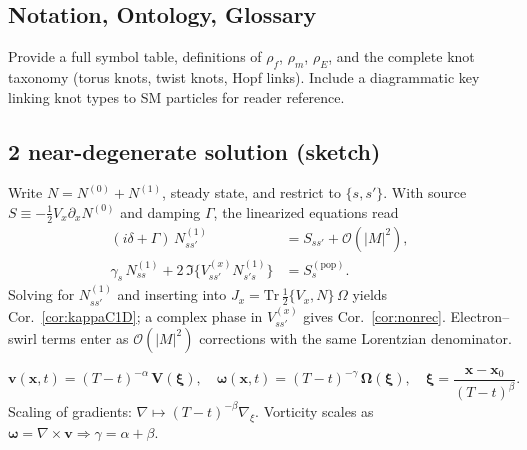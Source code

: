 \documentclass[10pt,reprint,aps,onecolumn,nofootinbib]{revtex4-2}
\begin{document}
\subsection{Notation, Ontology, Glossary}
\label{canon58:appI}
Provide a full symbol table, definitions of $\rho_{\!f}$, $\rho_{\!m}$, $\rho_{\!E}$,
and the complete knot taxonomy (torus knots, twist knots, Hopf links).
Include a diagrammatic key linking knot types to SM particles for reader reference.

\subsection{ 2 near-degenerate solution (sketch)}
Write $N=N^{(0)}+N^{(1)}$, steady state, and restrict to $\{s,s'\}$. With source $S\equiv -\tfrac12 V_x\partial_x N^{(0)}$ and damping $\Gamma$, the linearized equations read
\begin{align}
(i\delta+\Gamma)\,N^{(1)}_{ss'} &= S_{ss'} + \mathcal O(|M|^2),\\
\gamma_s\,N^{(1)}_{ss} + 2\,\Im\{V^{(x)}_{ss'}N^{(1)}_{s's}\} &= S^{(\mathrm{pop})}_s.
\end{align}
Solving for $N^{(1)}_{ss'}$ and inserting into $J_x=\mathrm{Tr}\,\tfrac12\{V_x,N\}\,\Omega$ yields Cor.~\ref{cor:kappaC1D}; a complex phase in $V^{(x)}_{ss'}$ gives Cor.~\ref{cor:nonrec}. Electron–swirl terms enter as $\mathcal O(|M|^2)$ corrections with the same Lorentzian denominator.


%
\[
    \mathbf{v}(\mathbf{x},t) = (T-t)^{-\alpha}\, \mathbf{V}\!\left(\boldsymbol{\xi}\right),\quad
    \boldsymbol{\omega}(\mathbf{x},t) = (T-t)^{-\gamma}\, \boldsymbol{\Omega}\!\left(\boldsymbol{\xi}\right),\quad
    \boldsymbol{\xi} = \frac{\mathbf{x}-\mathbf{x}_0}{(T-t)^{\beta}} .
\]
Scaling of gradients: \(\nabla \mapsto (T-t)^{-\beta}\nabla_{\!\xi}\).
Vorticity scales as \(\boldsymbol{\omega}=\nabla\times\mathbf{v}\Rightarrow \gamma=\alpha+\beta\).
\end{document}
